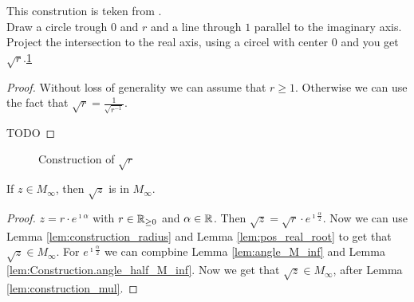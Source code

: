 This constrution is teken from \cite{JAN_SCHRÖER:2023}.\\
Draw a circle trough $0$ and $r$ and a line through $1$ parallel to the imaginary axis. Project the intersection to the real axis, using a circel with center $0$ and you get $\sqrt{r}$.\ref{Fig.root}
\begin{proof}
Without loss of generality we can assume that $r \ge 1$. Otherwise we can use the fact that $\sqrt{r} = \frac{1}{\sqrt{r^{-1}}}$.

TODO

\end{proof}
\begin{figure}[h]
    \centering
    \caption{Construction of $\sqrt{r}$}
    \label{Fig.root}
\end{figure}

\begin{corollary}
    \label{cor:root_M_inf}
    If $z \in M_{\infty}$, then $\sqrt{z}$ is in  $M_{\infty}$.
\end{corollary}
\begin{proof}
    $z = r \cdot e^{\imath \alpha}$ with $r \in \mathbb{R}_{\ge 0}$ and $\alpha \in \mathbb{R}$. Then $\sqrt{z} = \sqrt{r} \cdot e^{\imath \frac{\alpha}{2}}$.
    Now we can use Lemma \ref{lem:construction_radius} and Lemma \ref{lem:pos_real_root} to get that $\sqrt{z} \in M_{\infty}$. For $e^{\imath \frac{\alpha}{2}}$ we can compbine Lemma \ref{lem:angle_M_inf} and Lemma \ref{lem:Construction.angle_half_M_inf}. Now we get that $\sqrt{z} \in M_{\infty}$, after Lemma \ref{lem:construction_mul}.

\end{proof}

